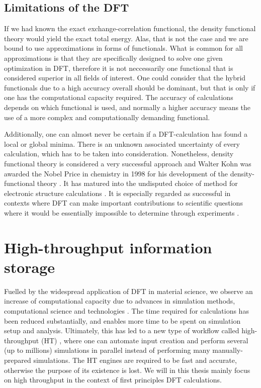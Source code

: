 \subsection{Limitations of the DFT}

If we had known the exact exchange-correlation functional, the density functional theory would yield the exact total energy. Alas, that is not the case and we are bound to use approximations in forms of functionals. What is common for all approximations is that they are specifically designed to solve one given optimization in DFT, therefore it is not neccessarily one functional that is considered superior in all fields of interest. One could consider that the hybrid functionals due to a high accuracy overall should be dominant, but that is only if one has the computational capacity required. The accuracy of calculations depends on which functional is used, and normally a higher accuracy means the use of a more complex and computationally demanding functional.

Additionally, one can almost never be certain if a DFT-calculation has found a local or global minima. There is an unknown associated uncertainty of every calculation, which has to be taken into consideration. Nonetheless, density functional theory is considered a very successful approach and Walter Kohn was awarded the Nobel Price in chemistry in 1998 for his development of the density-functional theory \cite{Freitas1999}. It has matured into the undisputed choice of method for electronic structure calculations \cite{Schleder2019}. It is especially regarded as successful in contexts where DFT can make important contributions to scientific questions where it would be essentially impossible to determine through experiments \cite{DavidSholl2009}. %

\section{High-throughput information storage}


Fuelled by the widespread application of DFT in material science, we observe an increase of computational capacity due to advances in simulation methods, computational science and technologies \cite{Schleder2019}. The time required for calculations has been reduced substantially, and enables more time to be spent on simulation setup and analysis. Ultimately, this has led to a new type of workflow called high-throughput (HT) \cite{Yang2017}, where one can automate input creation and perform several (up to millions) simulations in parallel instead of performing many manually-prepared simulations. The HT engines are required to be fast and accurate, otherwise the purpose of its existence is lost. We will in this thesis mainly focus on high throughput in the context of first principles DFT calculations.

